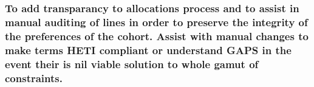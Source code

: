 \documentclass[
]{article}
\begin{document}
\hypertarget{to-add-transparancy-to-allocations-process-and-to-assist-in-manual-auditing-of-lines-in-order-to-preserve-the-integrity-of-the-preferences-of-the-cohort.-assist-with-manual-changes-to-make-terms-heti-compliant-or-understand-gaps-in-the-event-their-is-nil-viable-solution-to-whole-gamut-of-constraints.}{%
\subsubsection{To add transparancy to allocations process and to assist
in manual auditing of lines in order to preserve the integrity of the
preferences of the cohort. Assist with manual changes to make terms HETI
compliant or understand GAPS in the event their is nil viable solution
to whole gamut of
constraints.}\label{to-add-transparancy-to-allocations-process-and-to-assist-in-manual-auditing-of-lines-in-order-to-preserve-the-integrity-of-the-preferences-of-the-cohort.-assist-with-manual-changes-to-make-terms-heti-compliant-or-understand-gaps-in-the-event-their-is-nil-viable-solution-to-whole-gamut-of-constraints.}}
\end{document}
